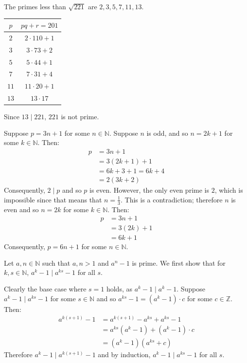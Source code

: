\documentclass{article}
\begin{document}
The primes less than $\sqrt{221}$ are $2, 3, 5, 7, 11, 13$.
\begin{center}
    \begin{tabular}{|c|c|}
        \hline
        $p$ & $pq + r = 201$ \\
        \hline
        $2$ & $2 \cdot 110 + 1$ \\
        \hline
        $3$ & $3 \cdot 73 + 2$ \\
        \hline
        $5$ & $5 \cdot 44 + 1$ \\
        \hline
        $7$ & $7 \cdot 31 + 4$ \\
        \hline
        $11$ & $11 \cdot 20 + 1$ \\
        \hline
        $13$ & $13 \cdot 17$ \\
        \hline
    \end{tabular}
\end{center}
Since $13 \mid 221$, $221$ is not prime.

\clearpage

\problem{}
Suppose $p = 3n + 1$ for some $n \in \mathbb{N}$. Suppose $n$ is odd, and so $n = 2k + 1$ for some $k \in \mathbb{N}$. Then:
\begin{align*}
    p & = 3n + 1 \\
    & = 3(2k + 1) + 1 \\
    & = 6k + 3 + 1 = 6k + 4 \\
    & = 2(3k + 2)
\end{align*}
Consequently, $2 \mid p$ and so $p$ is even. However, the only even prime is $2$, which is impossible since that means that $n = \frac{1}{3}$. This is a contradiction; therefore $n$ is even and so $n = 2k$ for some $k \in \mathbb{N}$. Then:
\begin{align*}
    p & = 3n + 1 \\
    & = 3(2k) + 1 \\
    & = 6k + 1
\end{align*}
Consequently, $p = 6n + 1$ for some $n \in \mathbb{N}$.

\clearpage

\problem{}
Let $a, n \in \mathbb{N}$ such that $a, n > 1$ and $a^n - 1$ is prime. We first show that for $k, s \in \mathbb{N}$, $a^k - 1 \mid a^{ks} - 1$ for all $s$.

Clearly the base case where $s = 1$ holds, as $a^k - 1 \mid a^k - 1$. Suppose $a^k - 1 \mid a^{ks} - 1$ for some $s \in \mathbb{N}$ and so $a^{ks} - 1 = (a^k - 1) \cdot c$ for some $c \in \mathbb{Z}$. Then:
\begin{align*}
    a^{k(s+1)} - 1 & = a^{k(s+1)} - a^{ks} + a^{ks} - 1 \\
    & = a^{ks}(a^k - 1) + (a^k - 1) \cdot c \\
    & = (a^k - 1)(a^{ks} + c)
\end{align*}
Therefore $a^k - 1 \mid a^{k(s+1)} - 1$ and by induction, $a^k - 1 \mid a^{ks} - 1$ for all $s$.
\end{document}
